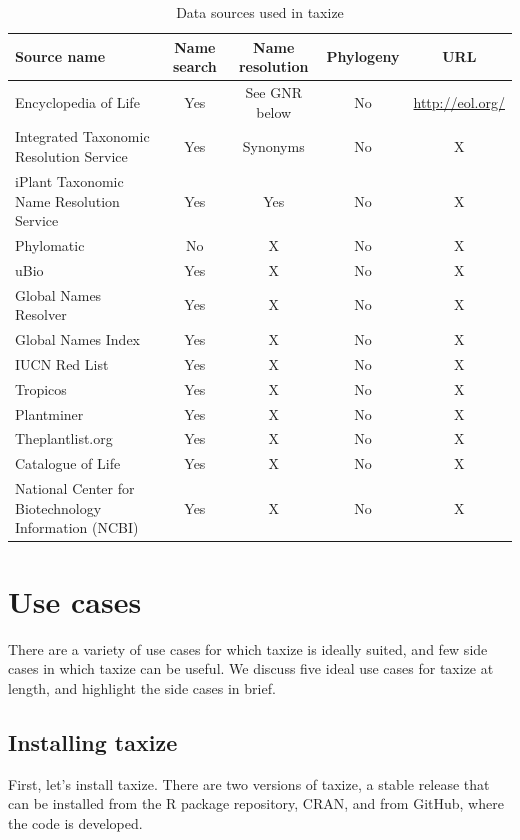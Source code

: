 \documentclass[letterpaper,superscriptaddress,showkeys,longbibliography]{revtex4-1}\usepackage{graphicx, color}
\begin{document}
\begin{table}[ht]
\caption{Data sources used in taxize} %
\centering %
\begin{tabular}{|l|ccc|c|}
\hline
Source name &  Name search & Name resolution & Phylogeny & URL  \\
\hline
Encyclopedia of Life & Yes & See GNR below & No & \url{http://eol.org/} \\
Integrated Taxonomic Resolution Service & Yes & Synonyms & No & X\\
iPlant Taxonomic Name Resolution Service & Yes & Yes & No & X \\
Phylomatic & No & X & No & X \\
uBio & Yes & X & No & X \\
Global Names Resolver & Yes & X & No & X \\
Global Names Index & Yes & X & No & X \\
IUCN Red List & Yes & X & No & X \\
Tropicos & Yes & X & No & X \\
Plantminer & Yes & X & No & X \\
Theplantlist.org & Yes & X & No & X \\
Catalogue of Life & Yes & X & No & X \\
National Center for Biotechnology Information (NCBI) & Yes & X & No & X \\
\hline
\end{tabular}
\label{table:nonlin} %
\end{table}

\section{Use cases}

There are a variety of use cases for which taxize is ideally suited, and few side cases in which taxize can be useful. We discuss five ideal use cases for taxize at length, and highlight the side cases in brief.

\subsection{Installing taxize}

First, let's install taxize. There are two versions of taxize, a stable release that can be installed from the R package repository, CRAN, and from GitHub, where the code is developed. 
\end{document}
